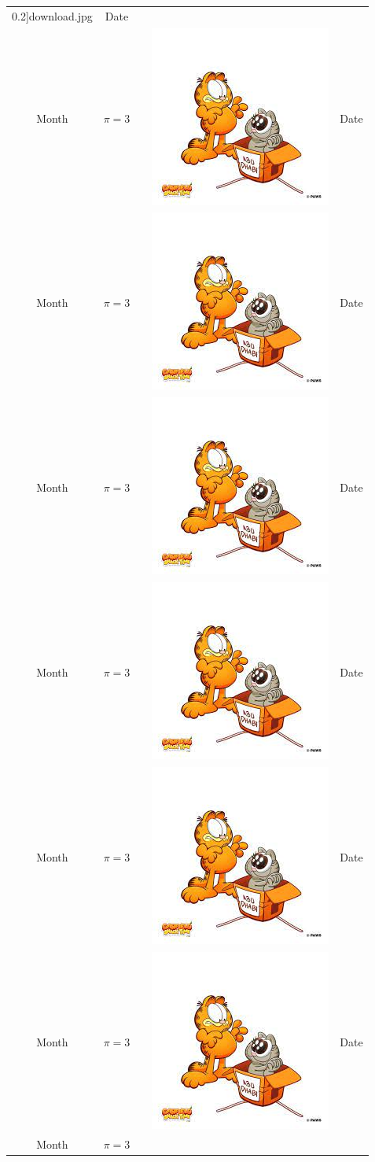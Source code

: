 \documentclass{article}
\theoremstyle{definition}
\theoremstyle{remark}
\begin{document}
\begin{longtable}{|c c|l|r|c|}
0.2\linewidth]{download.jpg} & Date \\Month & $\pi=3$ &  & \includegraphics[width=0.2\linewidth]{download.jpg} & Date \\Month & $\pi=3$ &  & \includegraphics[width=0.2\linewidth]{download.jpg} & Date \\Month & $\pi=3$ &  & \includegraphics[width=0.2\linewidth]{download.jpg} & Date \\Month & $\pi=3$ &  & \includegraphics[width=0.2\linewidth]{download.jpg} & Date \\Month & $\pi=3$ &  & \includegraphics[width=0.2\linewidth]{download.jpg} & Date \\Month & $\pi=3$ &  & \includegraphics[width=0.2\linewidth]{download.jpg} & Date \\Month & $\pi=3$ &  &
\end{longtable}
\end{document}
